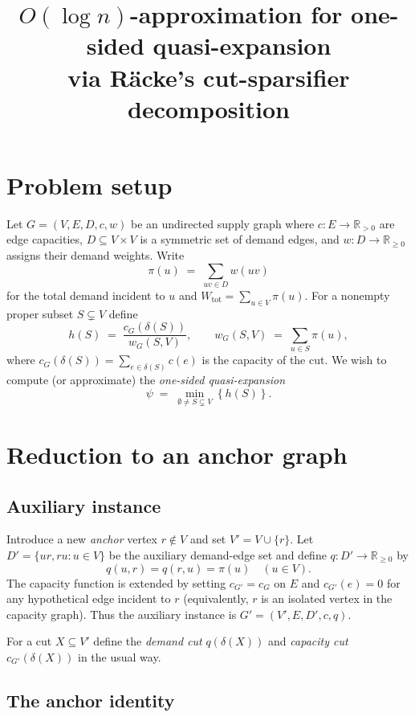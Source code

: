\documentclass[11pt]{article}
\newcommand{\cut}{\delta}
\newcommand{\brc}[1]{\mathopen{}\left\{ #1 \right\}}
\begin{document}
\title{$O(\log n)$-approximation for one-sided quasi-expansion\\
via Räcke's cut-sparsifier decomposition}
\date{}
\maketitle

\section{Problem setup}

Let $G=(V,E,D,c,w)$ be an undirected supply graph where $c\colon E\to\mathbb{R}_{>0}$
are edge capacities, $D\subseteq V\times V$ is a symmetric set of demand edges, and $w\colon D\to\mathbb{R}_{\ge 0}$ assigns their demand weights. Write
\[
  \pi(u) \;=\; \sum_{uv\in D} w(uv)
\]
for the total demand incident to $u$ and $W_{\mathrm{tot}}=\sum_{u\in V}\pi(u)$.
For a nonempty proper subset $S\subsetneq V$ define
\[
  h(S)\;=\;\frac{c_G(\cut(S))}{w_G(S,V)},
  \qquad
  w_G(S,V)\;=\;\sum_{u\in S}\pi(u),
\]
where $c_G(\cut(S))=\sum_{e\in\cut(S)}c(e)$ is the capacity of the cut.
We wish to compute (or approximate) the \emph{one-sided quasi-expansion}
\[
  \psi \;=\; \min_{\emptyset\neq S\subsetneq V} \brc{h(S)}.
\]

\section{Reduction to an anchor graph}

\subsection{Auxiliary instance}

Introduce a new \emph{anchor} vertex $r\notin V$ and set $V'=V\cup\{r\}$. Let $D'=\{ur,ru:u\in V\}$ be the auxiliary demand-edge set and define $q\colon D'\to\mathbb{R}_{\ge0}$ by
\[
  q(u,r)=q(r,u)=\pi(u)\quad(u\in V).
\]
The capacity function is extended by setting $c_{G'}=c_G$ on $E$ and $c_{G'}(e)=0$
for any hypothetical edge incident to $r$ (equivalently, $r$ is an isolated
vertex in the capacity graph). Thus the auxiliary instance is $G'=(V',E,D',c,q)$.

For a cut $X\subseteq V'$ define the \emph{demand cut} $q(\cut(X))$
and \emph{capacity cut} $c_{G'}(\cut(X))$ in the usual way.

\subsection{The anchor identity}
\end{document}
